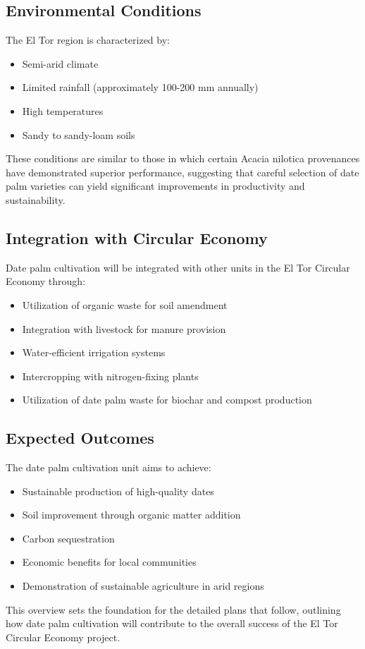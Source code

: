\subsection{Environmental Conditions}
The El Tor region is characterized by:
\begin{itemize}
    \item Semi-arid climate
    \item Limited rainfall (approximately 100-200 mm annually)
    \item High temperatures
    \item Sandy to sandy-loam soils
\end{itemize}

These conditions are similar to those in which certain Acacia nilotica provenances have demonstrated superior performance, suggesting that careful selection of date palm varieties can yield significant improvements in productivity and sustainability.

\subsection{Integration with Circular Economy}
Date palm cultivation will be integrated with other units in the El Tor Circular Economy through:
\begin{itemize}
    \item Utilization of organic waste for soil amendment
    \item Integration with livestock for manure provision
    \item Water-efficient irrigation systems
    \item Intercropping with nitrogen-fixing plants
    \item Utilization of date palm waste for biochar and compost production
\end{itemize}

\subsection{Expected Outcomes}
The date palm cultivation unit aims to achieve:
\begin{itemize}
    \item Sustainable production of high-quality dates
    \item Soil improvement through organic matter addition
    \item Carbon sequestration
    \item Economic benefits for local communities
    \item Demonstration of sustainable agriculture in arid regions
\end{itemize}

This overview sets the foundation for the detailed plans that follow, outlining how date palm cultivation will contribute to the overall success of the El Tor Circular Economy project.
